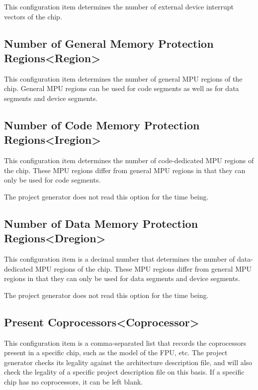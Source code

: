 This configuration item determines the number of external device interrupt vectors of the chip.

\subsection{Number of General Memory Protection Regions<Region>{}}\label{subsec:5-5-7}

This configuration item determines the number of general MPU regions of the chip. General MPU regions can be used for code segments as well as for data segments and device segments.

\subsection{Number of Code Memory Protection Regions<Iregion>{}}\label{subsec:5-5-8}

This configuration item determines the number of code-dedicated MPU regions of the chip. These MPU regions differ from general MPU regions in that they can only be used for code segments.

The project generator does not read this option for the time being.

\subsection{Number of Data Memory Protection Regions<Dregion>{}}\label{subsec:5-5-9}

This configuration item is a decimal number that determines the number of data-dedicated MPU regions of the chip. These MPU regions differ from general MPU regions in that they can only be used for data segments and device segments.

The project generator does not read this option for the time being.

\subsection{Present Coprocessors<Coprocessor>{}}\label{subsec:5-5-10}

This configuration item is a comma-separated list that records the coprocessors present in a specific chip, such as the model of the FPU, etc. The project generator checks its legality against the architecture description file, and will also check the legality of a specific project description file on this basis. If a specific chip has no coprocessors, it can be left blank.

